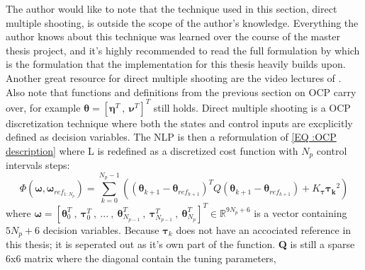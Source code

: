The author would like to note that the technique used in this section, direct multiple shooting, is outside the scope of the author's knowledge.
Everything the author knows about this technique was learned over the course of the master thesis project, and it's highly recommended to read the full formulation by \cite{breivik2017mpc}
which is the formulation that the implementation for this thesis heavily builds upon. Another great resource for direct multiple shooting are the video lectures of \cite{gros2017Lecture}.
Also note that functions and definitions from the previous section on \gls{OCP} carry over, for example $\bm{\theta} = [\bm{\eta}^T \ , \ \bm{\nu}^T]^T$ still holds.\newline
Direct multiple shooting is a \gls{OCP} discretization technique where both the states and control inputs are excplicitly defined as decision variables.
The \gls{NLP} is then a reformulation of \ref{EQ :OCP description} where L is redefined as a discretized cost function with $N_p$ control intervals steps:
\begin{equation} %
    \Phi(\bm{\omega}, \bm{\omega}_{ref_{1:N_p}}) = 
    \sum_{k=0}^{N_{p}-1} ((\bm{\theta}_{k+1} - \bm{\theta}_{ref_{k+1}})^T Q (\bm{\theta}_{k+1} - \bm{\theta}_{ref_{k+1}}) + K_{\bm{\tau}} \bm{\tau_k}^2)
\end{equation}
where $\bm{\omega} = [\bm{\theta}_0^T \ , \ \bm{\tau}_0^T \ , \ ... \ , \ \bm{\theta}_{N_{p-1}}^T \ , \ \bm{\tau}_{N_{p-1}}^T \ , \ \bm{\theta}_{N_{p}}^T]^T \in \mathbb{R}^{9N_{p}+6}$
is a vector containing $5N_p + 6$ decision variables.%
Because $\bm{\tau}_k$ does not have an accociated reference in this thesis; it is seperated out as it's own part of the function.
\textbf{Q} is still a sparse 6x6 matrix where the diagonal contain the tuning parameters,
